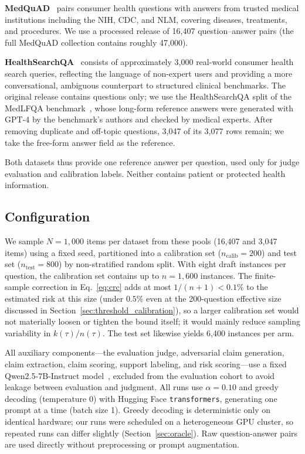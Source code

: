 \documentclass[sigconf, review, anonymous]{acmart}
\begin{document}
\textbf{MedQuAD}~\citep{benabacha2019} pairs consumer health questions with
answers from trusted medical institutions including the NIH, CDC, and NLM,
covering diseases, treatments, and procedures. We use a processed release
of 16{,}407 question--answer pairs (the full MedQuAD collection contains
roughly 47{,}000).

\textbf{HealthSearchQA}~\citep{singhal2023} consists of approximately
3{,}000 real-world consumer health search queries, reflecting the language
of non-expert users and providing a more conversational, ambiguous
counterpart to structured clinical benchmarks. The original release
contains questions only; we use the HealthSearchQA split of the MedLFQA
benchmark~\citep{jeong2024olaph}, whose long-form reference answers were
generated with GPT-4 by the benchmark's authors and checked by medical
experts. After removing duplicate and off-topic questions, 3{,}047 of its
3{,}077 rows remain; we take the free-form answer field as the reference.

Both datasets thus provide one reference answer per question, used only
for judge evaluation and calibration labels. Neither contains patient or
protected health information.

\subsection{Configuration}
\label{sec:config}

We sample $N = 1{,}000$ items per dataset from these pools (16{,}407 and
3{,}047 items) using a fixed seed, partitioned
into a calibration set ($n_{\text{calib}} = 200$) and test set
($n_{\text{test}} = 800$) by non-stratified random split. With eight draft instances per question, the
calibration set contains up to $n = 1{,}600$ instances. The finite-sample
correction in Eq.~\ref{eq:crc} adds at most $1/(n+1) < 0.1\%$ to the
estimated risk at this size (under $0.5\%$ even at the 200-question
effective size discussed in Section~\ref{sec:threshold_calibration}), so a larger calibration set would not
materially loosen or tighten the bound itself; it would mainly reduce
sampling variability in $k(\tau)/n(\tau)$. The test set likewise yields
6{,}400 instances per arm.

All auxiliary components---the evaluation judge, adversarial claim generation, claim extraction,
claim scoring, support labeling, and risk scoring---use a fixed
Qwen2.5-7B-Instruct model~\citep{yang2024}, excluded from the evaluation
cohort to avoid leakage between evaluation and judgment. All runs use
$\alpha = 0.10$ and greedy decoding (temperature 0) with Hugging Face
\texttt{transformers}, generating one prompt at a time (batch size 1).
Greedy decoding is deterministic only on identical hardware; our runs were
scheduled on a heterogeneous GPU cluster, so repeated runs can differ
slightly (Section~\ref{sec:oracle}). Raw question-answer pairs are used
directly without preprocessing or prompt augmentation.
\end{document}
